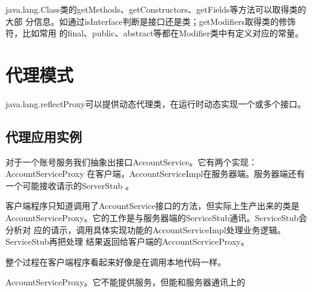 java.lang.Class类的getMethods、getConstructors、getFields等方法可以取得类的大部
分信息。如通过isInterface判断是接口还是类；getModifiers取得类的修饰符，比如常用
的final、public、abstract等都在Modifier类中有定义对应的常量。





\section{代理模式}

java.lang.reflectProxy可以提供动态代理类，在运行时动态实现一个或多个接口。



\subsection{代理应用实例}

对于一个账号服务我们抽象出接口AccountService。它有两个实现：AccountServiceProxy
在客户端，AccountServiceImpl在服务器端。服务器端还有一个可能接收请示的ServerStub
。

客户端程序只知道调用了AccountService接口的方法，但实际上生产出来的类是
AccountServiceProxy。它的工作是与服务器端的ServiceStub通讯。ServiceStub会分析对
应的请示，调用具体实现功能的AccountServiceImpl处理业务逻辑。ServiceStub再把处理
结果返回给客户端的AccountServiceProxy。

整个过程在客户端程序看起来好像是在调用本地代码一样。


AccountServiceProxy。它不能提供服务，但能和服务器通讯上的

